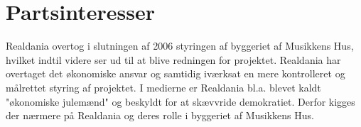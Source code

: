 \chapter{Partsinteresser}

Realdania overtog i slutningen af 2006 styringen af byggeriet af Musikkens Hus, hvilket indtil videre ser ud til at blive redningen for projektet. Realdania har overtaget det økonomiske ansvar og samtidig iværksat en mere kontrolleret og målrettet styring af projektet. I medierne er Realdania bl.a. blevet kaldt "økonomiske julemænd" og beskyldt for at skævvride demokratiet. Derfor kigges der nærmere på Realdania og deres rolle i byggeriet af Musikkens Hus. \citep{julemaend}